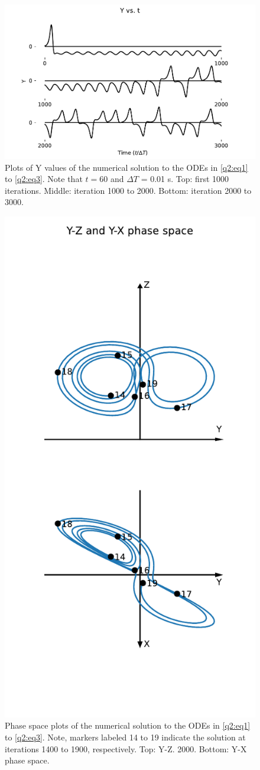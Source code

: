 \documentclass[a4paper,11pt]{article}
\theoremstyle{plain}
\theoremstyle{definition}
\theoremstyle{remark}
\begin{document}
\begin{figure}[H]
    \centering
    \includegraphics[width=\linewidth]{../plots/a3q2_y_vs_t.pdf}
    \caption{Plots of Y values of the
    numerical solution to the ODEs in \cref{q2:eq1} to \cref{q2:eq3}.
    Note that $t = 60$ and $\Delta T$ = 0.01 s. Top: first 1000 iterations.
    Middle: iteration 1000 to
    2000. Bottom: iteration 2000 to 3000.}
    \label{q2:1}
\end{figure}

\begin{figure}[H]
    \centering
    \includegraphics[width=0.6\linewidth]{../plots/a3q2_phase.pdf}
    \caption{Phase space plots of the
    numerical solution to the ODEs in \cref{q2:eq1} to \cref{q2:eq3}.
    Note, markers labeled
    14 to 19 indicate the solution at
    iterations 1400 to 1900, respectively. Top: Y-Z.
    2000. Bottom: Y-X phase space.}
    \label{q2:2}
\end{figure}
\end{document}
